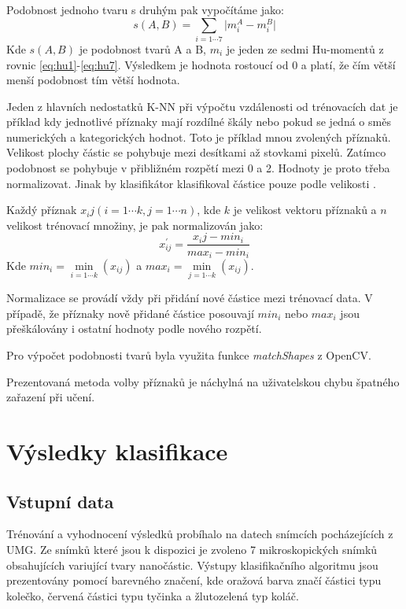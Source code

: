 \documentclass[11pt,twoside,a4paper,table]{book}
\begin{document}
Podobnost jednoho tvaru s druhým pak vypočítáme jako:
\begin{equation}
s(A,B) = \sum_{i=1\cdots 7}\vert m_i^A - m_i^B\vert
\end{equation}
Kde $s(A,B)$ je podobnost tvarů A a B, $m_i$ je jeden ze sedmi Hu-momentů z rovnic \ref{eq:hu1}-\ref{eq:hu7}. Výsledkem je hodnota rostoucí od $0$ a platí, že čím větší menší podobnost tím větší hodnota.

Jeden z hlavních nedostatků K-NN při výpočtu vzdálenosti od trénovacích dat je příklad kdy jednotlivé příznaky mají rozdílné škály nebo pokud se jedná o směs numerických a kategorických hodnot. Toto je příklad mnou zvolených příznaků. Velikost plochy částic se pohybuje mezi desítkami až stovkami pixelů. Zatímco podobnost se pohybuje v přibližném rozpětí mezi 0 a 2. Hodnoty je proto třeba normalizovat. Jinak by klasifikátor klasifikoval částice pouze podle velikosti \cite{flusser2000} \cite{art:objrec2d}.

Každý příznak $x_ij (i = 1\cdots k, j = 1\cdots n)$, kde $k$ je velikost vektoru příznaků a $n$ velikost trénovací množiny, je pak normalizován jako:
\begin{equation}
x^\prime_{ij} = \frac{x_ij - min_i}{max_i - min_i}
\end{equation}
Kde $min_i = \min\limits_{i=1\cdots k}(x_{ij})$ a $max_i = \min\limits_{j=1\cdots k}(x_{ij})$.

Normalizace se provádí vždy při přidání nové částice mezi trénovací data. V případě, že příznaky nově přidané částice posouvají $min_i$ nebo $max_i$ jsou přeškálovány i ostatní hodnoty podle nového rozpětí.

Pro výpočet podobnosti tvarů byla využita funkce \textit{matchShapes} z OpenCV\cite{opencv}.

Prezentovaná metoda volby příznaků je náchylná na uživatelskou chybu špatného zařazení při učení.

\section{Výsledky klasifikace}

\subsection{Vstupní data}
Trénování a vyhodnocení výsledků probíhalo na datech snímcích pocházejících z UMG. Ze snímků které jsou k dispozici je zvoleno 7 mikroskopických snímků obsahujících variující tvary nanočástic. Výstupy klasifikačního algoritmu jsou prezentovány pomocí barevného značení, kde oražová barva značí částici typu kolečko, červená částici typu tyčinka a žlutozelená typ koláč. 
\end{document}
